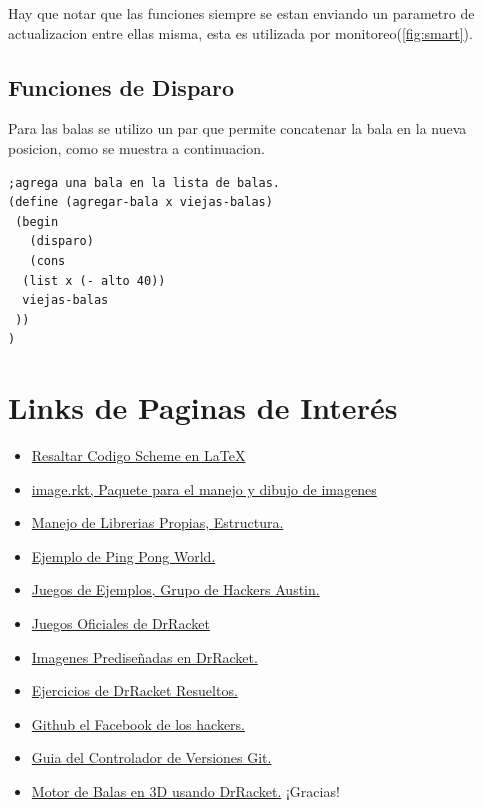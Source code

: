 \documentclass[a4paper]{article} %
\begin{document}
Hay que notar que las funciones siempre se estan enviando un parametro de actualizacion entre ellas misma, esta es utilizada por monitoreo(\ref{fig:smart}).
\subsection{Funciones de Disparo}
Para las balas se utilizo un par que permite concatenar la bala en la nueva posicion, como se muestra a continuacion.

\begin{lstlisting}
;agrega una bala en la lista de balas. 
(define (agregar-bala x viejas-balas)
 (begin
   (disparo)
   (cons 
  (list x (- alto 40)) 
  viejas-balas
 ))  
)
\end{lstlisting}

\clearpage
\newpage
\section{Links de Paginas de Interés \label{Herramientas}}
\begin{itemize}
\item \href{https://github.com/stuhlmueller/scheme-listings}{Resaltar Codigo Scheme en \LaTeX}
\item \href{http://docs.racket-lang.org/teachpack/2htdpimage.html?q=2htdp}{image.rkt, Paquete para el manejo y dibujo de imagenes}
\item \href{http://docs.racket-lang.org/guide/module-basics.html}{Manejo de Librerias Propias, Estructura.}
\item \href{http://https://github.com/darrencruse/pong-world-racket}{Ejemplo de Ping Pong World.}
\item \href{http://austinmaddocks.weebly.com/drracket.html}{Juegos de Ejemplos, Grupo de Hackers Austin.}
\item \href{http://docs.racket-lang.org/games/}{Juegos Oficiales de DrRacket}
\item \href{http://docs.racket-lang.org/teachpack/2htdpPlanet_Cute_Images.html}{Imagenes Prediseñadas en DrRacket.}
\item \href{https://github.com/buntine/Simply-Scheme-Exercises}{Ejercicios de DrRacket Resueltos.}
\item \href{https://github.com/}{Github el Facebook de los hackers.}
\item \href{https://try.github.io/levels/1/challenges/1}{Guia del Controlador de Versiones Git.}
\item \href{https://github.com/davexunit/gnumaku}{Motor de Balas en 3D usando DrRacket.}
¡Gracias!
\end{itemize}
\end{document}
